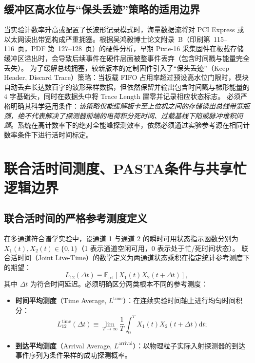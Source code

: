 \subsection{缓冲区高水位与“保头丢迹”策略的适用边界}

当实验计数率升高或配置了长波形记录模式时，海量数据流将对 PCI Express 或以太网读出带宽构成严重拥塞。根据吴鸿毅博士论文附录~B（印刷第~115--116~页，PDF 第~127--128~页）的硬件分析，早期 Pixie-16 采集固件在板载存储缓冲区溢出时，会导致后续事件在硬件层面被整事件丢弃（包含时间戳与能量完全丢失）。
为了缓解总线拥塞，较新版本的定制固件引入了“保头丢迹”（Keep Header, Discard Trace）策略：当板载 FIFO 占用率超过预设高水位门限时，模块自动丢弃长达数百字的波形采样数据，但依然保留并输出包含时间戳与梯形能量的 4 字基础头，同时在数据头中将 Trace Length 置零并记录相应状态标志。
必须严格明确其科学适用条件：\emph{该策略仅能缓解板卡至上位机之间的存储读出总线带宽瓶颈，绝不代表解决了探测器前端的电荷积分死时间、过载基线下陷或脉冲堆积问题}。系统在高计数率下的绝对全能峰探测效率，依然必须通过实验参考源在相同计数率条件下进行活时间标定。

\section{联合活时间测度、PASTA条件与共享忙逻辑边界}\label{sec:appE-joint-live}

\subsection{联合活时间的严格参考测度定义}

在多通道符合谱学实验中，设通道 1 与通道 2 的瞬时可用状态指示函数分别为 $X_1(t), X_2(t) \in \{0, 1\}$（1 表示通道空闲可用，0 表示处于忙/死时间状态）。
联合活时间（Joint Live-Time）的数学定义为两通道状态乘积在指定统计参考测度下的期望：
\begin{equation}\label{eq:appE-joint-live-def}
L_{12}(\Delta t) \equiv \mathbb{E}_{\mathrm{ref}}\left[ X_1(t) X_2(t + \Delta t) \right],
\end{equation}
其中 $\Delta t$ 为符合时间延迟。必须明确区分两类根本不同的参考测度：
\begin{itemize}
\item \textbf{时间平均测度}（Time Average, $L^{\mathrm{time}}$）：在连续实验时间轴上进行均匀时间积分：
\begin{equation}\label{eq:appE-time-avg}
L_{12}^{\mathrm{time}}(\Delta t) \equiv \lim_{T \to \infty} \frac{1}{T} \int_0^T X_1(t) X_2(t + \Delta t) \mathrm{d}t;
\end{equation}
\item \textbf{到达平均测度}（Arrival Average, $L^{\mathrm{arrival}}$）：以物理粒子实际入射探测器的到达事件序列为条件采样的成功探测概率。
\end{itemize}

